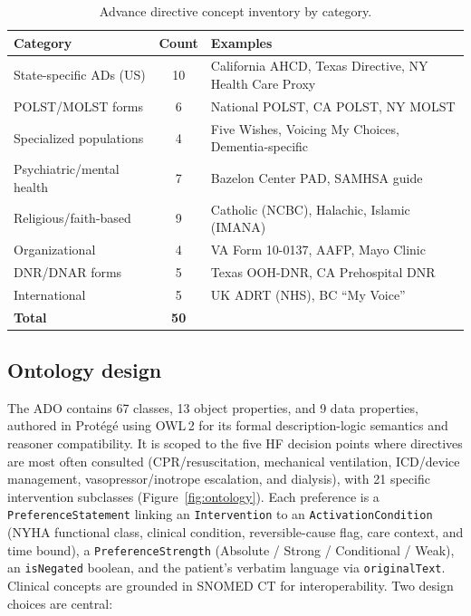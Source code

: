 \documentclass[10pt]{article}
\newcommand{\onto}[1]{\texttt{\small #1}}
\begin{document}
\begin{table}[ht]
\centering
\caption{Advance directive concept inventory by category.}
\label{tab:inventory}
\small
\begin{tabularx}{0.95\textwidth}{Xc>{\raggedright\arraybackslash}X}
\toprule
\textbf{Category} & \textbf{Count} & \textbf{Examples} \\
\midrule
State-specific ADs (US) & 10 & California AHCD, Texas Directive, NY Health Care Proxy \\
POLST/MOLST forms & 6 & National POLST, CA POLST, NY MOLST \\
Specialized populations & 4 & Five Wishes, Voicing My Choices, Dementia-specific \\
Psychiatric/mental health & 7 & Bazelon Center PAD, SAMHSA guide \\
Religious/faith-based & 9 & Catholic (NCBC), Halachic, Islamic (IMANA) \\
Organizational & 4 & VA Form 10-0137, AAFP, Mayo Clinic \\
DNR/DNAR forms & 5 & Texas OOH-DNR, CA Prehospital DNR \\
International & 5 & UK ADRT (NHS), BC ``My Voice'' \\
\midrule
\textbf{Total} & \textbf{50} & \\
\bottomrule
\end{tabularx}
\end{table}

\subsection{Ontology design}
The ADO contains 67 classes, 13 object properties, and 9 data properties, authored in Prot\'eg\'e\cite{protege} using OWL\,2\cite{owl2primer} for its formal description-logic semantics and reasoner compatibility. It is scoped to the five HF decision points where directives are most often consulted (CPR/resuscitation, mechanical ventilation, ICD/device management, vasopressor/inotrope escalation, and dialysis), with 21 specific intervention subclasses (Figure~\ref{fig:ontology}). Each preference is a \onto{PreferenceStatement} linking an \onto{Intervention} to an \onto{ActivationCondition} (NYHA functional class,\cite{nyha} clinical condition, reversible-cause flag, care context, and time bound), a \onto{PreferenceStrength} (Absolute / Strong / Conditional / Weak), an \onto{isNegated} boolean, and the patient's verbatim language via \onto{originalText}. Clinical concepts are grounded in SNOMED CT\cite{snomedct} for interoperability. Two design choices are central:
\end{document}
